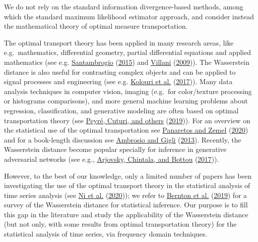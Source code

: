 \documentclass[
  11pt,
]{article}
\begin{document}
We do not rely on the standard information divergence-based methods,
among which the standard maximum likelihood estimator approach, and
consider instead the mathematical theory of optimal measure
transportation.

The optimal transport theory has been applied in many research areas,
like e.g.~mathematics, differential geometry, partial differential
equations and applied mathematics (see e.g.
\protect\hyperlink{ref-santambrogio2015optimal}{Santambrogio}
(\protect\hyperlink{ref-santambrogio2015optimal}{2015}) and
\protect\hyperlink{ref-villani2009optimal}{Villani}
(\protect\hyperlink{ref-villani2009optimal}{2009})). The Wasserstein
distance is also useful for contrasting complex objects and can be
applied to signal processes and engineering (see e.g.
\protect\hyperlink{ref-kolouri2017optimal}{Kolouri et al.}
(\protect\hyperlink{ref-kolouri2017optimal}{2017})). Many data analysis
techniques in computer vision, imaging (e.g.~for color/texture
processing or histograms comparisons), and more general machine learning
problems about regression, classification, and generative modeling are
often based on optimal transportation theory (see
\protect\hyperlink{ref-peyre2019computational}{Peyré, Cuturi, and
others} (\protect\hyperlink{ref-peyre2019computational}{2019})). For an
overview on the statistical use of the optimal transportation see
\protect\hyperlink{ref-panaretos2020invitation}{Panaretos and Zemel}
(\protect\hyperlink{ref-panaretos2020invitation}{2020}) and for a
book-length discussion see
\protect\hyperlink{ref-ambrosio2013user}{Ambrosio and Gigli}
(\protect\hyperlink{ref-ambrosio2013user}{2013}). Recently, the
Wasserstein distance become popular specially for inference in
generative adversarial networks (see e.g.,
\protect\hyperlink{ref-arjovsky2017wasserstein}{Arjovsky, Chintala, and
Bottou} (\protect\hyperlink{ref-arjovsky2017wasserstein}{2017})).

However, to the best of our knowledge, only a limited number of papers
has been investigating the use of the optimal transport theory in the
statistical analysis of time series analysis (see
\protect\hyperlink{ref-ni2020conditional}{Ni et al.}
(\protect\hyperlink{ref-ni2020conditional}{2020})); we refer to
\protect\hyperlink{ref-bernton2019parameter}{Bernton et al.}
(\protect\hyperlink{ref-bernton2019parameter}{2019}) for a survey of the
Wasserstein distance for statistical inference. Our purpose is to fill
this gap in the literature and study the applicability of the
Wasserstein distance (but not only, with some results from optimal
transportation theory) for the statistical analysis of time series, via
frequency domain techniques. 
\end{document}
